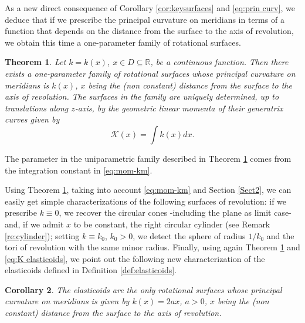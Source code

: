 \documentclass[leqno,11pt]{amsart}
\def\R{\mathbb{R}}
\newtheorem{theorem}{Theorem}[section]
\newtheorem{corollary}[theorem]{Corollary}
\theoremstyle{definition}
\numberwithin{equation}{section}
\begin{document}
As a new direct consequence of Corollary \ref{cor:keysurfaces} and \eqref{eq:prin curv}, we deduce that if we prescribe the principal curvature on meridians in terms of a function that depends on the distance from the surface to the axis of revolution, we obtain this time a one-parameter family of rotational surfaces. 

\begin{theorem}
	\label{th:Prescribe_km}
	Let $k=k(x)$, $x\in D \subseteq \R $, be a continuous function.
	Then there exists a one-parameter family of rotational surfaces whose principal curvature on meridians is $k(x)$, 
	$x$ being the (non constant) distance from the surface to the axis of revolution.
	The surfaces in the family are uniquely determined, up to translations along $z$-axis, by the geometric linear momenta of their generatrix curves given by
	\begin{equation}\label{eq:mom-km}
		\mathcal K (x) =  \int \!   k(x) dx.
	\end{equation}
\end{theorem}

The parameter in the uniparametric family described in Theorem \ref{th:Prescribe_km} comes from the integration constant in \eqref{eq:mom-km}.

Using Theorem \ref{th:Prescribe_km}, taking into account \eqref{eq:mom-km} and Section \ref{Sect2}, we can easily get simple characterizations of the following surfaces of revolution: if we prescribe $k\equiv 0$, we recover the circular cones -including the plane as limit case- and, if we admit $x$ to be constant, the right circular cylinder (see Remark \ref{re:cylinder}); setting $k \equiv k_0$, $k_0>0$, we detect the sphere of radius $1/k_0$ and the tori of revolution with the same minor radius. Finally, using again Theorem \ref{th:Prescribe_km} and \eqref{eq:K elasticoids}, we point out the following new characterization of the elasticoids defined in Definition \ref{def:elasticoids}.

\begin{corollary}\label{cor:Eleaticoids}
	The elasticoids are the only rotational surfaces whose principal curvature on meridians is given by $k(x)=2a x$, $a >0$, $x$ being the (non constant) distance from the surface to the axis of revolution.
\end{corollary} 
\end{document}
